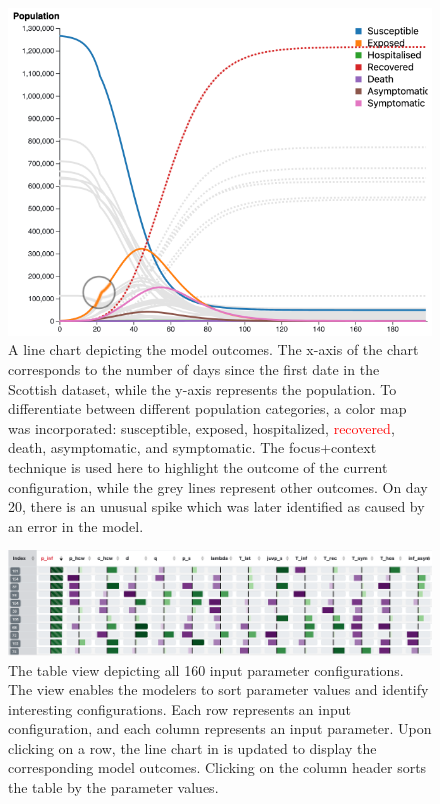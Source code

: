 \documentclass{article}
\begin{document}
\begin{figure}[h!]
    \centering
    \includegraphics[width=\linewidth]{figures/1st-line.png}
    \caption{A line chart depicting the model outcomes.
    The x-axis of the chart corresponds to the number of days since the first date in the Scottish dataset, while the y-axis represents the population.
    To differentiate between different population categories, a color map was incorporated: \textcolor{DodgerBlue1}{susceptible}, \textcolor{Chocolate1}{exposed}, \textcolor{Green4}{hospitalized}, \textcolor{red}{recovered}, \textcolor{DarkOrchid1}{death}, \textcolor{LightSalmon4}{asymptomatic}, and \textcolor{HotPink1}{symptomatic}.
    The focus+context technique is used here to highlight the outcome of the current configuration, while the grey lines represent other outcomes. On day 20, there is an unusual spike which was later identified as caused by an error in the model.
    }
    \label{fig:1st-line}

\end{figure}


\begin{figure}[h!]
    \centering
    \includegraphics[angle=90,height=0.9\textheight]{figures/table.png}
    \caption{The table view depicting all 160 input parameter configurations.
    The view enables the modelers to sort parameter values and identify interesting configurations.
    Each row represents an input configuration, and each column represents an input parameter.
    Upon clicking on a row, the line chart in  is updated to display the corresponding model outcomes.
    Clicking on the column header sorts the table by the parameter values.
    }
    \label{fig:table-view}

\end{figure}
\end{document}
